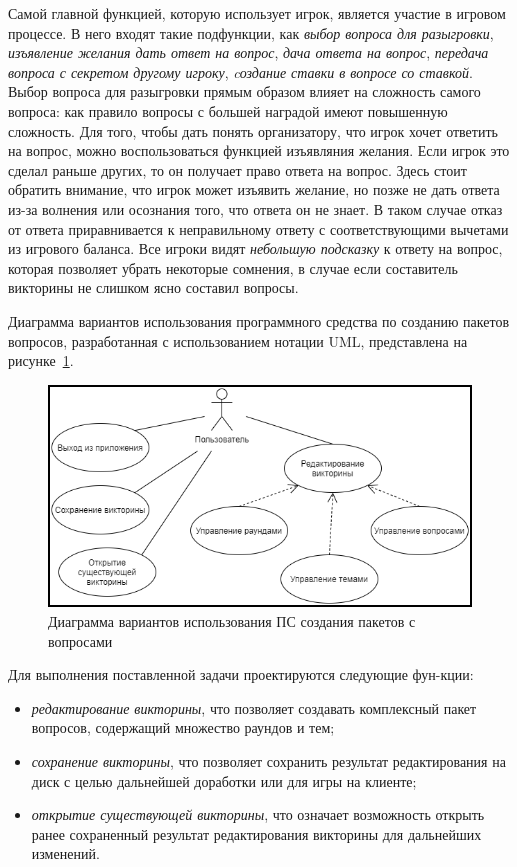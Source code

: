 Самой главной функцией, которую использует игрок, является участие в игровом процессе. В него входят такие подфункции, как \emph{выбор вопроса для разыгровки},
\emph{изъявление желания дать ответ на вопрос}, \emph{дача ответа на вопрос}, \emph{передача вопроса с секретом другому игроку}, \emph{cоздание ставки в вопросе со ставкой}.
Выбор вопроса для разыгровки прямым образом влияет на сложность самого вопроса: как правило вопросы с большей наградой имеют повышенную сложность. Для того, чтобы дать понять
организатору, что игрок хочет ответить на вопрос, можно воспользоваться функцией изъявляния желания. Если игрок это сделал раньше других, то он получает право ответа на вопрос.
Здесь стоит обратить внимание, что игрок может изъявить желание, но позже не дать ответа из-за волнения или осознания того, что ответа он не знает. В таком случае отказ от ответа 
приравнивается к неправильному ответу с соответствующими вычетами из игрового баланса. Все игроки видят \emph{небольшую подсказку} к ответу на вопрос, которая позволяет убрать некоторые 
сомнения, в случае если составитель викторины не слишком ясно составил вопросы.

Диаграмма вариантов использования программного средства по созданию пакетов вопросов, разработанная с использованием нотации UML, представлена на рисунке~\ref{fig:domain:model:use_cases:model_test}.

\begin{figure}[!ht]
    \centering
        \includegraphics[scale=1]{attachments/use_case_model_test.png}
        \caption{Диаграмма вариантов использования ПС создания пакетов с вопросами}
        \label{fig:domain:model:use_cases:model_test}
    \end{figure}

Для выполнения поставленной задачи проектируются следующие фун-кции:

\begin{itemize}
	\item \emph{редактирование викторины}, что позволяет создавать комплексный пакет вопросов, содержащий множество раундов и тем;
	\item \emph{сохранение викторины}, что позволяет сохранить результат редактирования на диск с целью дальнейшей доработки или для игры на клиенте;
	\item \emph{открытие существующей викторины}, что означает возможность открыть ранее сохраненный результат редактирования викторины для дальнейших изменений.
\end{itemize}

